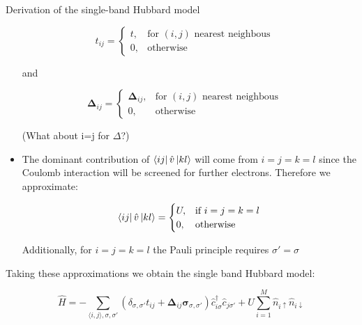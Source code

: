 \begin{section}{Derivation of the single-band Hubbard model}
\begin{itemize}
\begin{equation}
t_{ij} = \begin{cases}
             t,  & \text{for } (i,j) \text{ nearest neighbous} \\
             0,  & \text{otherwise}
       \end{cases} \quad
\end{equation}

and

\begin{equation}
\boldsymbol{\Delta}_{ij} = \begin{cases}
             \boldsymbol{\Delta}_{ij},  & \text{for } (i,j) \text{ nearest neighbous} \\
             0,  & \text{otherwise}
       \end{cases} \quad
\end{equation}

(What about i=j for $\Delta$?)

\item The dominant contribution of $\bra{ij} \hat{v} \ket{kl}$ will come from $i=j=k=l$ since the Coulomb interaction will be screened for further electrons. Therefore we approximate:

\begin{equation}
\bra{ij} \hat{v} \ket{kl} =
	\begin{cases}
		U, & \text{if } i=j=k=l \\
		0, & \text{otherwise}
	\end{cases}						
\end{equation}

Additionally, for $i=j=k=l$ the Pauli principle requires $\sigma' = \sigma$

\end{itemize}

Taking these approximations we obtain the single band Hubbard model:

\begin{equation}
\label{Hubbard}
\hat{H} = -\sum_{\langle i,j \rangle, \sigma, \sigma'}(\delta_{\sigma, \sigma'} t_{ij} + \boldsymbol{\Delta}_{ij} \boldsymbol{\sigma}_{\sigma, \sigma'})\hat{c}_{i \sigma}^\dagger \hat{c}_{j \sigma'} + U \sum_{i=1}^M \hat{n}_{i\uparrow}\hat{n}_{i\downarrow}
\end{equation}

\end{section}

